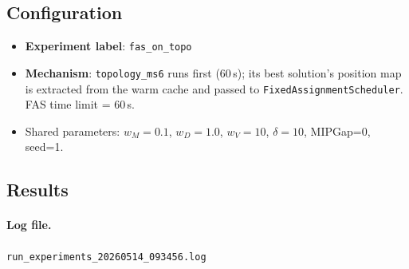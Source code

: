 \subsection{Configuration}

\begin{itemize}[noitemsep]
    \item \textbf{Experiment label}: \texttt{fas\_on\_topo}
    \item \textbf{Mechanism}: \texttt{topology\_ms6} runs first (60\,s); its best
          solution's position map is extracted from the warm cache and passed to
          \texttt{FixedAssignmentScheduler}.  FAS time limit = 60\,s.
    \item Shared parameters: $w_M=0.1$, $w_D=1.0$, $w_V=10$, $\delta=10$,
          MIPGap=0, seed=1.
\end{itemize}

\subsection{Results}
\label{exp:exp03-results}

\paragraph{Log file.} \texttt{run\_experiments\_20260514\_093456.log}

